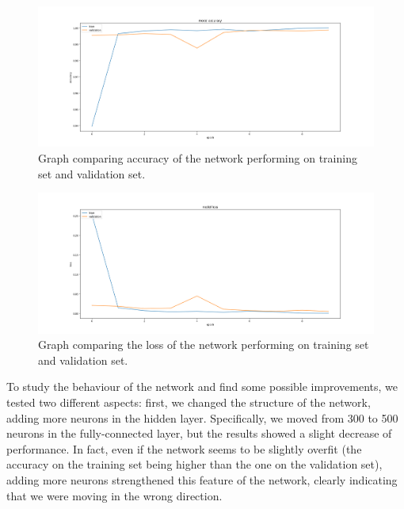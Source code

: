 \begin{figure}
	\centering
	\begin{minipage}{0.9\textwidth}
		\centering
		\includegraphics[width=1\textwidth]{300-acc_1.png}
	\end{minipage}
	\caption{Graph comparing accuracy of the network performing on training set and validation set.}
	\label{fig3-300-acc}
\end{figure}
\begin{figure}
	\centering
	\begin{minipage}{0.9\textwidth}
		\centering
		\includegraphics[width=1\textwidth]{300-loss_1.png} 
	\end{minipage}
	\caption{Graph comparing the loss of the network performing on training set and validation set.}
	\label{fig4-300-loss}
\end{figure}

To study the behaviour of the network and find some possible improvements, we tested two different aspects: first, we changed the structure of the network, adding more neurons in the hidden layer. Specifically, we moved from 300 to 500 neurons in the fully-connected layer, but the results showed a slight decrease of performance. In fact, even if the network seems to be slightly overfit (the accuracy on the training set being higher than the one on the validation set), adding more neurons strengthened this feature of the network, clearly indicating that we were moving in the wrong direction.

